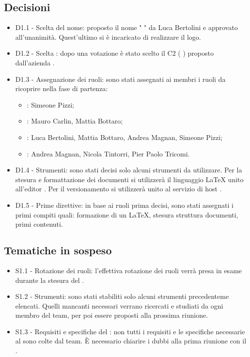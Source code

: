 \documentclass[a4paper,titlepage]{article}
\begin{document}
 \subsection{Decisioni}
 \begin{itemize}
  \item D1.1 - Scelta del nome: proposto il nome " \GRUPPO{} " da Luca Bertolini e approvato all'unanimità. Quest'ultimo si è incaricato di realizzare il logo.
  \item D1.2 - Scelta : dopo una votazione è stato scelto il  C2 ( \PROGETTO) proposto dall'azienda \PROPONENTE.
  \item D1.3 - Assegnazione dei ruoli: sono stati assegnati ai membri i ruoli da ricoprire nella fase di partenza:
  \begin{itemize}
  \item \RESP: Simeone Pizzi;
  \item \AMMP: Mauro Carlin, Mattia Bottaro;
  \item \VERP: Luca Bertolini, Mattia Bottaro, Andrea Magnan, Simeone Pizzi;
  \item \ANP: Andrea Magnan, Nicola Tintorri, Pier Paolo Tricomi.
  \end{itemize}
  \item D1.4 - Strumenti: sono stati decisi solo alcuni strumenti da utilizzare. Per la stesura e formattazione dei documenti si utilizzerà il linguaggio \LaTeX{}{} unito all'editor . Per il versionamento si utilizzerà  unito al servizio di host . 
  \item D1.5 - Prime direttive: in base ai ruoli prima decisi, sono stati assegnati i primi compiti quali: formazione di un  \LaTeX{}{}, stesura struttura documenti, primi contenuti.
 \end{itemize}

\subsection{Tematiche in sospeso} 
  \begin{itemize}
  \item S1.1 - Rotazione dei ruoli: l'effettiva rotazione dei ruoli verrà presa in esame durante la stesura del \PPdoc.
  \item S1.2 - Strumenti: sono stati stabiliti solo alcuni strumenti precedenteme elencati. Quelli mancanti necessari verrano ricercati e studiati da ogni membro del team, per poi essere proposti alla prossima riunione.
  \item S1.3 - Requisiti e specifiche del : non tutti i requisiti e le specifiche necessarie al  sono colte dal team. È necessario chiarire i dubbi alla prima riunione con il .
  \end{itemize}
\end{document}
